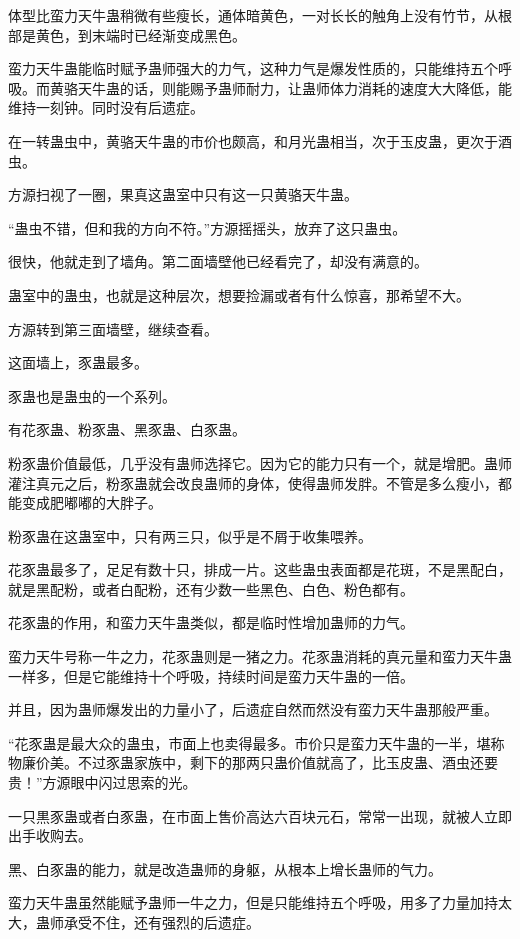 \begin{this_body}
体型比蛮力天牛蛊稍微有些瘦长，通体暗黄色，一对长长的触角上没有竹节，从根部是黄色，到末端时已经渐变成黑色。

蛮力天牛蛊能临时赋予蛊师强大的力气，这种力气是爆发性质的，只能维持五个呼吸。而黄骆天牛蛊的话，则能赐予蛊师耐力，让蛊师体力消耗的速度大大降低，能维持一刻钟。同时没有后遗症。

在一转蛊虫中，黄骆天牛蛊的市价也颇高，和月光蛊相当，次于玉皮蛊，更次于酒虫。

方源扫视了一圈，果真这蛊室中只有这一只黄骆天牛蛊。

“蛊虫不错，但和我的方向不符。”方源摇摇头，放弃了这只蛊虫。

很快，他就走到了墙角。第二面墙壁他已经看完了，却没有满意的。

蛊室中的蛊虫，也就是这种层次，想要捡漏或者有什么惊喜，那希望不大。

方源转到第三面墙壁，继续查看。

这面墙上，豕蛊最多。

豕蛊也是蛊虫的一个系列。

有花豕蛊、粉豕蛊、黑豕蛊、白豕蛊。

粉豕蛊价值最低，几乎没有蛊师选择它。因为它的能力只有一个，就是增肥。蛊师灌注真元之后，粉豕蛊就会改良蛊师的身体，使得蛊师发胖。不管是多么瘦小，都能变成肥嘟嘟的大胖子。

粉豕蛊在这蛊室中，只有两三只，似乎是不屑于收集喂养。

花豕蛊最多了，足足有数十只，排成一片。这些蛊虫表面都是花斑，不是黑配白，就是黑配粉，或者白配粉，还有少数一些黑色、白色、粉色都有。

花豕蛊的作用，和蛮力天牛蛊类似，都是临时性增加蛊师的力气。

蛮力天牛号称一牛之力，花豕蛊则是一猪之力。花豕蛊消耗的真元量和蛮力天牛蛊一样多，但是它能维持十个呼吸，持续时间是蛮力天牛蛊的一倍。

并且，因为蛊师爆发出的力量小了，后遗症自然而然没有蛮力天牛蛊那般严重。

“花豕蛊是最大众的蛊虫，市面上也卖得最多。市价只是蛮力天牛蛊的一半，堪称物廉价美。不过豕蛊家族中，剩下的那两只蛊价值就高了，比玉皮蛊、酒虫还要贵！”方源眼中闪过思索的光。

一只黒豕蛊或者白豕蛊，在市面上售价高达六百块元石，常常一出现，就被人立即出手收购去。

黑、白豕蛊的能力，就是改造蛊师的身躯，从根本上增长蛊师的气力。

蛮力天牛蛊虽然能赋予蛊师一牛之力，但是只能维持五个呼吸，用多了力量加持太大，蛊师承受不住，还有强烈的后遗症。


\end{this_body}
